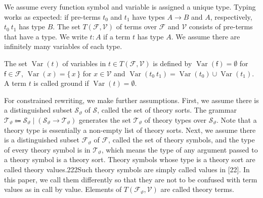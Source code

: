 We assume every function symbol and variable is assigned a unique type. Typing works as expected: if pre-terms $t_{0}$ and $t_{1}$ have types $A\rightarrow B$ and $A$, respectively, ${t_{0}}\ {t_{1}}$ has type $B$. The set $T(\mathcal{F},\mathcal{V})$ of terms over $\mathcal{F}$ and $\mathcal{V}$ consists of pre-terms that have a type. We write $t:A$ if a term $t$ has type $A$. We assume there are infinitely many variables of each type.\par
 
 
 
The set $\operatorname{Var}(t)$ of variables in $t\in T(\mathcal{F},\mathcal{V})$ is defined by $\operatorname{Var}(\mathsf{f})=\emptyset$ for $\mathsf{f}\in\mathcal{F}$, $\operatorname{Var}(x)=\{\,x\,\}$ for $x\in\mathcal{V}$ and $\operatorname{Var}({t_{0}}\ {t_{1}})=\operatorname{Var}(t_{0})\cup\operatorname{Var}(t_{1})$. A term $t$ is called ground if $\operatorname{Var}(t)=\emptyset$.\par
 
 
 
For constrained rewriting, we make further assumptions. First, we assume there is a distinguished subset ${\mathcal{S}}_{\vartheta}$ of $\mathcal{S}$, called the set of theory sorts. The grammar ${\mathcal{T}}_{\vartheta}\Coloneqq{\mathcal{S}}_{\vartheta}\mid({\mathcal{S}}_{\vartheta}\rightarrow{\mathcal{T}}_{\vartheta})$ generates the set ${\mathcal{T}}_{\vartheta}$ of theory types over ${\mathcal{S}}_{\vartheta}$. Note that a theory type is essentially a non-empty list of theory sorts. Next, we assume there is a distinguished subset ${\mathcal{F}}_{\vartheta}$ of $\mathcal{F}$, called the set of theory symbols, and the type of every theory symbol is in ${\mathcal{T}}_{\vartheta}$, which means the type of any argument passed to a theory symbol is a theory sort. Theory symbols whose type is a theory sort are called theory values.222Such theory symbols are simply called values in [22]. In this paper, we call them differently so that they are not to be confused with term values as in call by value. Elements of $T({\mathcal{F}}_{\vartheta},\mathcal{V})$ are called theory terms.\par
 
 
 
